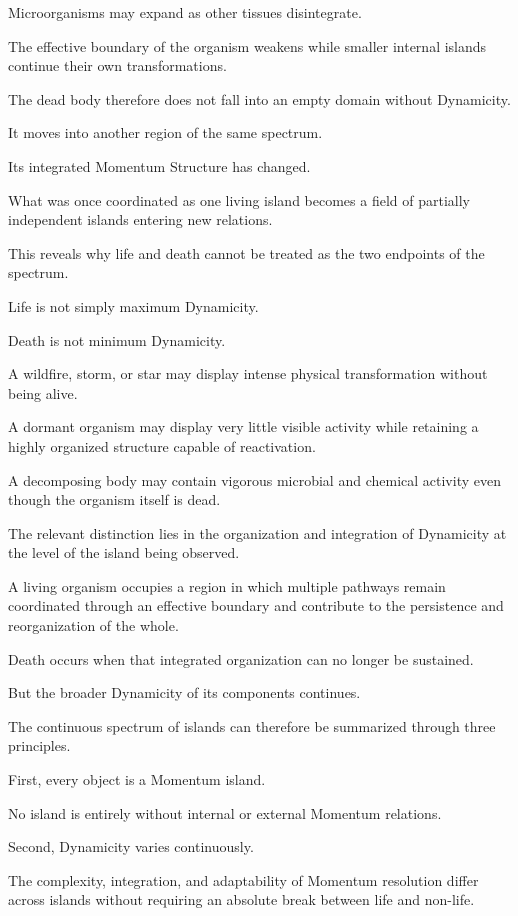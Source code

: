 Microorganisms may expand as other tissues disintegrate.

The effective boundary of the organism weakens while smaller internal islands continue their own transformations.

The dead body therefore does not fall into an empty domain without Dynamicity.

It moves into another region of the same spectrum.

Its integrated Momentum Structure has changed.

What was once coordinated as one living island becomes a field of partially independent islands entering new relations.

This reveals why life and death cannot be treated as the two endpoints of the spectrum.

Life is not simply maximum Dynamicity.

Death is not minimum Dynamicity.

A wildfire, storm, or star may display intense physical transformation without being alive.

A dormant organism may display very little visible activity while retaining a highly organized structure capable of reactivation.

A decomposing body may contain vigorous microbial and chemical activity even though the organism itself is dead.

The relevant distinction lies in the organization and integration of Dynamicity at the level of the island being observed.

A living organism occupies a region in which multiple pathways remain coordinated through an effective boundary and contribute to the persistence and reorganization of the whole.

Death occurs when that integrated organization can no longer be sustained.

But the broader Dynamicity of its components continues.

The continuous spectrum of islands can therefore be summarized through three principles.

First, every object is a Momentum island.

No island is entirely without internal or external Momentum relations.

Second, Dynamicity varies continuously.

The complexity, integration, and adaptability of Momentum resolution differ across islands without requiring an absolute break between life and non-life.

